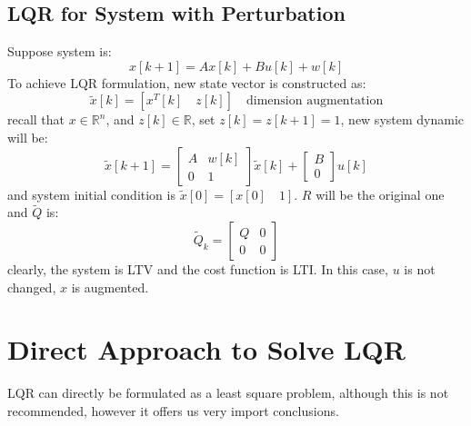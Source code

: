 \documentclass[10pt,a4paper,oneside]{article}
\begin{document}
\subsection{LQR for System with Perturbation}
Suppose system is:
\[
x[k+1] = Ax[k] + Bu[k] + w[k]
\]
To achieve LQR formulation, new state vector is constructed as:
\[
\tilde{x}[k] = [x^T[k] \quad z[k]] \quad \text{dimension augmentation}
\]
recall that $x \in \mathbb{R}^n$, and $z[k] \in \mathbb{R}$, set $z[k] = z[k+1] =1$, new system dynamic will be:
\[
\tilde{x}[k+1] = \begin{bmatrix}
A & w[k] \\ 0& 1
\end{bmatrix} \tilde{x}[k] + \begin{bmatrix}
B \\ 0
\end{bmatrix} u[k]
\]
and system initial condition is $\tilde{x}[0] = [x[0] \quad 1]$. $R$ will be the original one and $\tilde{Q}$ is:
\[
\tilde{Q}_k = \begin{bmatrix}
Q & 0\\
0 & 0
\end{bmatrix}
\]
clearly, the system is LTV and the cost function is LTI. In this case, $u$ is not changed, $x$ is augmented.

\section{Direct Approach to Solve LQR}
LQR can directly be formulated as a least square problem, although this is not recommended, however it offers us very import conclusions.
\end{document}
